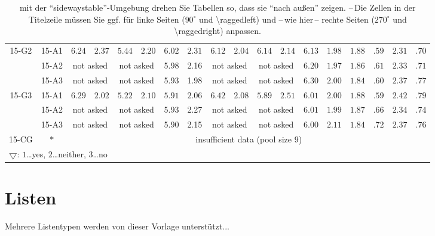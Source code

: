 \begin{mytable}
\begin{sidewaystable}
\begin{center}
\begin{tabular}{cc|cc|cc|cc|cc|cc|cc|cc|cc}
			\midrule
			\multirow{3}{*}{15-G2}
			& 15-A1 & $6.24$ & $2.37$ & $5.44$ & $2.20$ & $6.02$ & $2.31$ & $6.12$ & $2.04$ & $6.14$ & $2.14$ & $6.13$ & $1.98$ & $1.88$ & $.59$ & $2.31$ & $.70$ \\
			& 15-A2 & \multicolumn{2}{c|}{not asked} & \multicolumn{2}{c|}{not asked} & 5.98 & 2.16 & \multicolumn{2}{c|}{not asked} & \multicolumn{2}{c|}{not asked} & $6.20$ & $1.97$ & $1.86$ & $.61$ & $2.33$ & $.71$ \\
			& 15-A3 & \multicolumn{2}{c|}{not asked} & \multicolumn{2}{c|}{not asked} & 5.93 & 1.98 & \multicolumn{2}{c|}{not asked} & \multicolumn{2}{c|}{not asked}& $6.30$ & $2.00$ & $1.84$ & $.60$ & $2.37$ & $.77$ \\

			\midrule
			\multirow{3}{*}{15-G3}
			& 15-A1 & $6.29$ & $2.02$ & $5.22$ & $2.10$ & $5.91$ & $2.06$ & $6.42$ & $2.08$ & $5.89$ & $2.51$ & $6.01$ & $2.00$ & $1.88$ & $.59$ & $2.42$ & $.79$ \\
			& 15-A2 & \multicolumn{2}{c|}{not asked} & \multicolumn{2}{c|}{not asked} & 5.93 & 2.27 & \multicolumn{2}{c|}{not asked} & \multicolumn{2}{c|}{not asked} & $6.01$ & $1.99$ & $1.87$ & $.66$ & $2.34$ & $.74$ \\
			& 15-A3 & \multicolumn{2}{c|}{not asked} & \multicolumn{2}{c|}{not asked} & 5.90 & 2.15 & \multicolumn{2}{c|}{not asked} & \multicolumn{2}{c|}{not asked}& $6.00$ & $2.11$ & $1.84$ & $.72$ & $2.37$ & $.76$ \\

			\midrule
			15-CG & $\ast$ & \multicolumn{16}{c}{insufficient data (pool size $9$)} \\

			\midrule
			\multicolumn{18}{l}{$\bigtriangledown$: $1$\ldots yes, $2$\ldots neither, $3$\ldots no} \\

		\end{tabular}
		\caption[Seitwärtstabelle]{mit der \enquote{sidewaystable}-Umgebung drehen Sie Tabellen so, dass sie \enquote{nach außen} zeigen. --\,Die Zellen in der Titelzeile müssen Sie ggf. für linke Seiten ($90^{\circ}$ und \textbackslash{}raggedleft) und --\,wie hier\,-- rechte Seiten ($270^{\circ}$ und \textbackslash{}raggedright) anpassen.}\label{tab:Motivation2015}
	\end{center}
\end{sidewaystable}\end{mytable}



\section{Listen}\label{sec:apdx:Lists}
\noindent Mehrere Listentypen werden von dieser Vorlage unterstützt...

